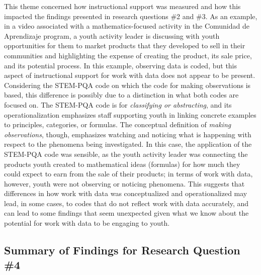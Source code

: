\documentclass[]{msu-thesis}
\theoremstyle{definition}
\theoremstyle{definition}
\theoremstyle{definition}
\theoremstyle{remark}
\begin{document}
This theme concerned how instructional support was measured and how this
impacted the findings presented in research questions \#2 and \#3. As an
example, in a video associated with a mathematics-focused activity in
the Comunidad de Aprendizaje program, a youth activity leader is
discussing with youth opportunities for them to market products that
they developed to sell in their communities and highlighting the expense
of creating the product, its sale price, and its potential process. In
this example, observing data is coded, but this aspect of instructional
support for work with data does not appear to be present. Considering
the STEM-PQA code on which the code for making observations is based,
this difference is possibly due to a distinction in what both codes are
focused on. The STEM-PQA code is for \emph{classifying or abstracting},
and its operationalization emphasizes staff supporting youth in linking
concrete examples to principles, categories, or formulas. The conceptual
definition of \emph{making observations}, though, emphasizes watching
and noticing what is happening with respect to the phenomena being
investigated. In this case, the application of the STEM-PQA code was
sensible, as the youth activity leader was connecting the products youth
created to mathematical ideas (formulas) for how much they could expect
to earn from the sale of their products; in terms of work with data,
however, youth were not observing or noticing phenomena. This suggests
that differences in how work with data was conceptualized and
operationalized may lead, in some cases, to codes that do not reflect
work with data accurately, and can lead to some findings that seem
unexpected given what we know about the potential for work with data to
be engaging to youth.

\subsection{Summary of Findings for Research Question
\#4}\label{summary-of-findings-for-research-question-4}
\end{document}
